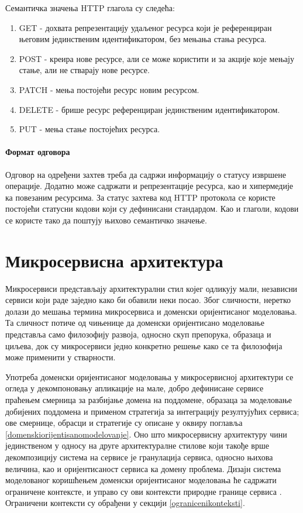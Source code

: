 \documentclass[12pt,oneside]{memoir}
\begin{document}
Семантичка значења HTTP глагола су следећа:
\begin{enumerate}
\item GET - дохвата репрезентацију удаљеног ресурса који је референциран његовим јединственим идентификатором, без мењања стања ресурса.
\item POST - креира нове ресурсе, али се може користити и за акције које мењају стање, али не стварају нове ресурсе.
\item PATCH - мења постојећи ресурс новим ресурсом.
\item DELETE - брише ресурс референциран јединственим идентификатором.
\item PUT - мења стање постојећих ресурса.
\end{enumerate}

\subsubsection{Формат одговора}
Одговор на одређени захтев треба да садржи информацију о статусу извршене операције. Додатно може садржати и репрезентације ресурса, као и хипермедије ка повезаним ресурсима. За статус захтева код HTTP протокола се користе постојећи статусни кодови који су дефинисани стандардом. Као и глаголи, кодови се користе тако да поштују њихово семантичко значење.

\chapter{Микросервисна архитектура}\label{mikroservisi}
Микросервиси представљају архитектурални стил којег одликују мали, независни сервиси који раде заједно како би обавили неки посао. Због сличности, неретко долази до мешања термина микросервиса и доменски оријентисаног моделовања. Та сличност потиче од чињенице да доменски оријентисано моделовање представља само филозофију развоја, односно скуп препорука, образаца и циљева, док су микросервиси једно конкретно решење како се та филозофија може применити у стварности.

Употреба доменски оријентисаног моделовања у микросервисној архитектури се огледа у декомпоновању апликације на мале, добро дефинисане сервисе праћењем смерница за разбијање домена на поддомене, образаца за моделовање добијених поддомена и применом стратегија за интеграцију резултујућих сервиса; ове смернице, обрасци и стратегије су описане у оквиру поглавља \ref{domenskiorijentisanomodelovanje}. Оно што микросервисну архитектуру чини јединственом у односу на друге архитектуралне стилове који такође врше декомпозицију система на сервисе је гранулација сервиса, односно њихова величина, као и оријентисаност сервиса ка домену проблема. Дизајн система моделованог коришћењем доменски оријентисаног моделовања ће садржати ограничене контексте, и управо су ови контексти природне границе сервиса \cite{netmicroservices}. Ограничени контексти су обрађени у секцији \ref{ogranicenikonteksti}.
\end{document}
